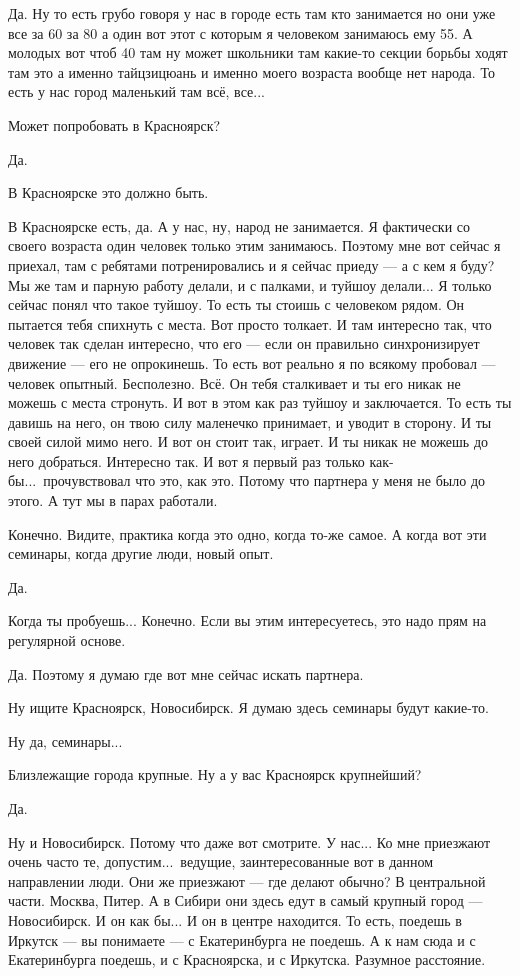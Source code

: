 \I
Да. Ну то есть грубо говоря у нас в городе есть там кто занимается но они уже все за 60 за 80 а
один вот этот с которым я человеком занимаюсь ему 55.
А молодых вот чтоб 40 там ну может школьники там какие-то секции борьбы ходят там это а
именно тайцзицюань и именно моего возраста вообще нет народа.
То есть у нас город маленький там всё, все...

\A
Может попробовать в Красноярск?

\I
Да.

\A
В Красноярске это должно быть.

\I
В Красноярске есть, да.
А у нас, ну, народ не занимается.
Я фактически со своего возраста один человек только этим занимаюсь.
Поэтому мне вот сейчас я приехал, там с ребятами потренировались и я сейчас приеду ---
а с кем я буду?
Мы же там и парную работу делали, и с палками, и туйшоу делали...
Я только сейчас понял что такое туйшоу.
То есть ты стоишь с человеком рядом.
Он пытается тебя спихнуть с места.
Вот просто толкает.
И там интересно так, что человек так сделан интересно, что его
--- если он правильно синхронизирует движение --- его не опрокинешь.
То есть вот реально я по всякому пробовал --- человек опытный.
Бесполезно.
Всё. Он тебя сталкивает и ты его никак не можешь с места стронуть.
И вот в этом как раз туйшоу и заключается.
То есть ты давишь на него, он твою силу маленечко принимает, и уводит в сторону.
И ты своей силой мимо него.
И вот он стоит так, играет.
И ты никак не можешь до него добраться.
Интересно так.
И вот я первый раз только как-бы...\ прочувствовал что это, как это.
Потому что партнера у меня не было до этого.
А тут мы в парах работали.

\A
Конечно.
Видите, практика когда это одно, когда то-же самое.
А когда вот эти семинары, когда другие люди, новый опыт.

\I
Да.

\A
Когда ты пробуешь... Конечно.
Если вы этим интересуетесь, это надо прям на регулярной основе.

\I
Да.
Поэтому я думаю где вот мне сейчас искать партнера.

\A
Ну ищите Красноярск, Новосибирск.
Я думаю здесь семинары будут какие-то.

\I
Ну да, семинары...

\A
Близлежащие города крупные.
Ну а у вас Красноярск крупнейший?

\I
Да.

\A
Ну и Новосибирск.
Потому что даже вот смотрите.
У нас... Ко мне приезжают очень часто те, допустим...\ ведущие,
заинтересованные вот в данном направлении люди.
Они же приезжают --- где делают обычно?
В центральной части.
Москва, Питер.
А в Сибири они здесь едут в
самый крупный город --- Новосибирск.
И он как бы...
И он в центре находится.
То есть, поедешь в Иркутск --- вы понимаете --- с Екатеринбурга не поедешь.
А к нам сюда и с Екатеринбурга поедешь, и с Красноярска, и с Иркутска.
Разумное расстояние.

